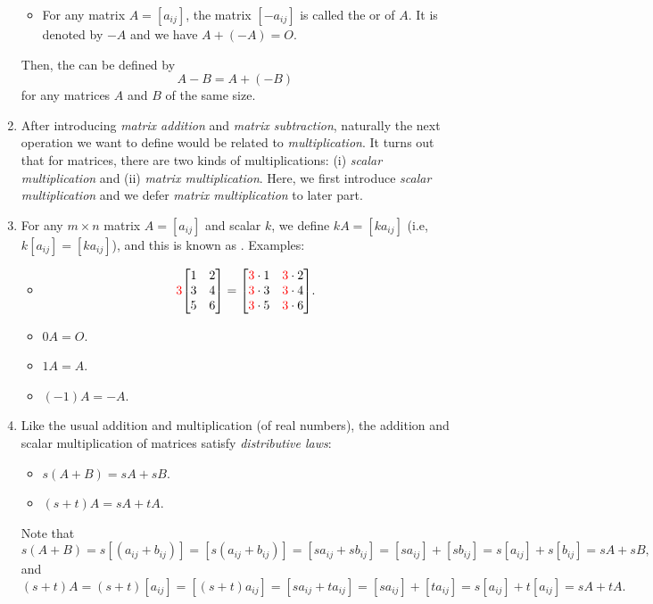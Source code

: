\begin{enumerate}
\begin{itemize}
\item For any matrix \(A=[a_{ij}]\), the matrix \([-a_{ij}]\) is called the
 or  of \(A\). It is denoted by \(-A\)
and we have \(A+(-A)=O\).
\end{itemize}
Then, the  can be defined by
\[
A-B=A+(-B)
\]
for any matrices \(A\) and \(B\) of the same size.

\item After introducing \emph{matrix addition} and \emph{matrix subtraction},
naturally the next operation we want to define would be related to
\emph{multiplication}. It turns out that for matrices, there are two kinds of
multiplications: (i) \emph{scalar multiplication} and (ii) \emph{matrix
multiplication}. Here, we first introduce \emph{scalar multiplication} and we
defer \emph{matrix multiplication} to later part.

\item For any \(m\times n\) matrix \(A=[a_{ij}]\) and scalar \(k\), we define
\(kA=[ka_{ij}]\) (i.e, \(k[a_{ij}]=[ka_{ij}]\)), and this is known as
. Examples:
\begin{itemize}
\item \[
\rc{3}\mqty[1&2\\3&4\\5&6]
=\mqty[\rc{3}\cdot 1&\rc{3}\cdot 2\\ \rc{3}\cdot 3 & \rc{3}\cdot 4\\ \rc{3}\cdot 5& \rc{3}\cdot 6].
\]
\item \(0A=O\).
\item \(1A=A\).
\item \((-1)A=-A\).
\end{itemize}
\item \label{it:matrix-add-scalar-mult-dist}
Like the usual addition and multiplication (of real numbers), the
addition and scalar multiplication of matrices satisfy \emph{distributive
laws}:
\begin{itemize}
\item \(s(A+B)=sA+sB\).
\item \((s+t)A=sA+tA\).
\end{itemize}
\begin{pf}
Note that
\[
s(A+B)=s[(a_{ij}+b_{ij})]
=[s(a_{ij}+b_{ij})]
=[sa_{ij}+sb_{ij}]
=[sa_{ij}]+[sb_{ij}]
=s[a_{ij}]+s[b_{ij}]
=sA+sB,
\]
and
\[
(s+t)A=(s+t)[a_{ij}]
=[(s+t)a_{ij}]
=[sa_{ij}+ta_{ij}]
=[sa_{ij}]+[ta_{ij}]
=s[a_{ij}]+t[a_{ij}]
=sA+tA.
\]
\end{pf}


\end{enumerate}

